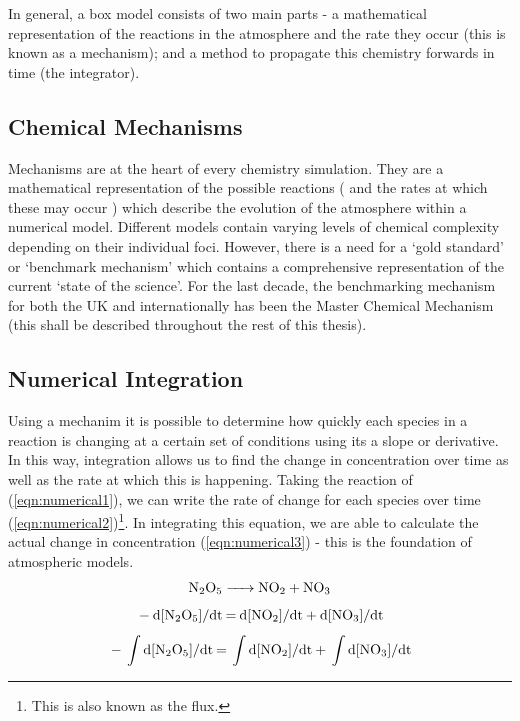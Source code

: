 In general, a box model consists of two main parts - a mathematical representation of the reactions in the atmosphere and the rate they occur (this is known as a mechanism); and a method to propagate this chemistry forwards in time (the integrator).



\subsection{Chemical Mechanisms}
Mechanisms are at the heart of every chemistry simulation. They are a mathematical representation of the possible reactions ( and the rates at which these may occur ) which describe the evolution of the atmosphere within a numerical model. Different models contain varying levels of chemical complexity depending on their individual foci. However, there is a need for a `gold standard' or `benchmark mechanism' which contains a comprehensive representation of the current `state of the science'. For the last decade, the benchmarking mechanism for both the UK and internationally has been the Master Chemical Mechanism \citep{mcm} (this shall be described throughout the rest of this thesis).


\subsection{Numerical Integration}
Using a mechanim it is possible to determine how quickly each species in a reaction is changing at a certain set of conditions using its a slope or derivative. In this way, integration allows us to find the change in concentration over time as well as the rate at which this is happening.  Taking the reaction of  (\autoref{eqn:numerical1}), we can write the rate of change for each species over time (\autoref{eqn:numerical2})\footnote{This is also known as the flux.}. In integrating this equation, we are able to calculate the actual change in concentration (\autoref{eqn:numerical3}) - this is the foundation of atmospheric models.
\begin{equation}
\ce{N2O5 ->    NO2} + \ce{NO3}
\label{eqn:numerical1}
\end{equation}
\begin{equation}
\ce{- d[N2O5]/dt =   d[NO2]/dt} + \ce{d[NO3]/dt}
\label{eqn:numerical2}
\end{equation}
\begin{equation}
\ce{ - \int d[N2O5]/dt =  \int d[NO2]/dt} + \ce{\int d[NO3]/dt}
\label{eqn:numerical3}
\end{equation}
